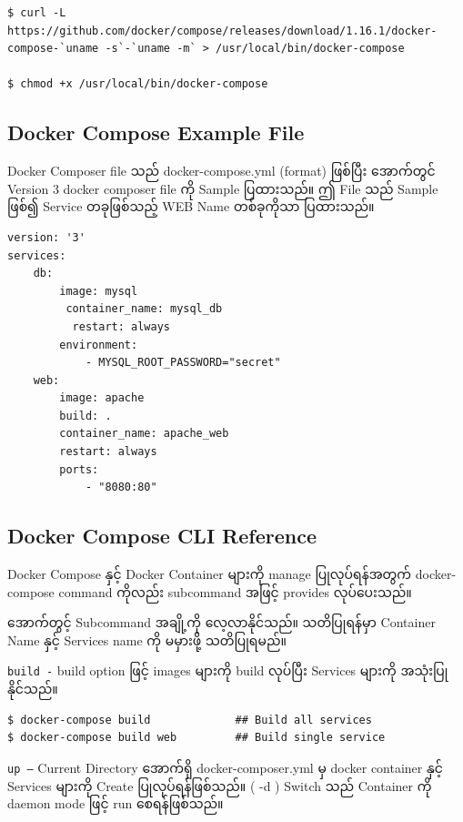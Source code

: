 \documentclass[]{article}
\begin{document}
\begin{verbatim}
$ curl -L https://github.com/docker/compose/releases/download/1.16.1/docker-compose-`uname -s`-`uname -m` > /usr/local/bin/docker-compose

$ chmod +x /usr/local/bin/docker-compose
\end{verbatim}

\hypertarget{docker-compose-example-file}{%
\subsection{Docker Compose Example
File}\label{docker-compose-example-file}}

Docker Composer file သည် docker-compose.yml (format) ဖြစ်ပြီး အောက်တွင်
Version 3 docker composer file ကို Sample ပြထားသည်။ ဤ File သည် Sample
ဖြစ်၍ Service တခုဖြစ်သည့် WEB Name တစ်ခုကိုသာ ပြထားသည်။

\begin{verbatim}
version: '3'
services:
    db:
        image: mysql
         container_name: mysql_db
          restart: always
        environment:
            - MYSQL_ROOT_PASSWORD="secret"
    web:
        image: apache
        build: .
        container_name: apache_web
        restart: always
        ports:
            - "8080:80"
\end{verbatim}

\hypertarget{docker-compose-cli-reference}{%
\subsection{Docker Compose CLI
Reference}\label{docker-compose-cli-reference}}

Docker Compose နှင့် Docker Container များကို manage ပြုလုပ်ရန်အတွက်
docker-compose command ကိုလည်း subcommand အဖြင့် provides လုပ်ပေးသည်။

အောက်တွင့် Subcommand အချို့ကို လေ့လာနိုင်သည်။ သတိပြုရန်မှာ Container
Name နှင့် Services name ကို မမှားဖို့ သတိပြုရမည်။

\texttt{build\ -} build option ဖြင့် images များကို build လုပ်ပြီး
Services များကို အသုံးပြုနိုင်သည်။

\begin{verbatim}
$ docker-compose build             ## Build all services
$ docker-compose build web         ## Build single service
\end{verbatim}

\texttt{up\ –} Current Directory အောက်ရှိ docker-composer.yml မှ docker
container နှင့် Services များကို Create ပြုလုပ်ရန်ဖြစ်သည်။ ( -d ) Switch
သည် Container ကို daemon mode ဖြင့် run စေရန်ဖြစ်သည်။
\end{document}
